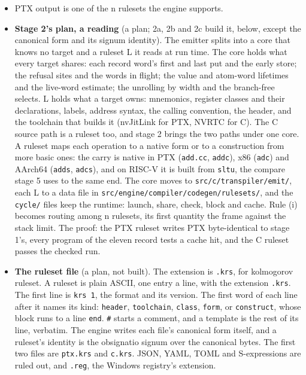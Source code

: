 \begin{enumerate}
\begin{itemize}
\begin{enumerate}
\begin{itemize}
\item PTX output is one of the n rulesets the engine supports.
\item \textbf{Stage 2's plan, a reading} (a plan; 2a, 2b and 2c build it, below, except the canonical form and its signum identity). The emitter splits into a core that knows no target and a ruleset L it reads at run time. The core holds what every target shares: each record word's first and last put and the early store; the refusal sites and the words in flight; the value and atom-word lifetimes and the live-word estimate; the unrolling by width and the branch-free selects. L holds what a target owns: mnemonics, register classes and their declarations, labels, address syntax, the calling convention, the header, and the toolchain that builds it (nvJitLink for PTX, NVRTC for C). The C source path is a ruleset too, and stage 2 brings the two paths under one core. A ruleset maps each operation to a native form or to a construction from more basic ones: the carry is native in PTX (\texttt{add.\allowbreak{}cc}, \texttt{addc}), x86 (\texttt{adc}) and AArch64 (\texttt{adds}, \texttt{adcs}), and on RISC-V it is built from \texttt{sltu}, the compare stage 5 uses to the same end. The core moves to \texttt{src/\allowbreak{}c/\allowbreak{}transpiler/\allowbreak{}emit/\allowbreak{}}, each L to a data file in \texttt{src/\allowbreak{}engine/\allowbreak{}compiler/\allowbreak{}codegen/\allowbreak{}rulesets/\allowbreak{}}, and the \texttt{cycle/\allowbreak{}} files keep the runtime: launch, share, check, block and cache. Rule (i) becomes routing among n rulesets, its first quantity the frame against the stack limit. The proof: the PTX ruleset writes PTX byte-identical to stage 1's, every program of the eleven record tests a cache hit, and the C ruleset passes the checked run.
\item \textbf{The ruleset file} (a plan, not built). The extension is \texttt{.\allowbreak{}krs}, for kolmogorov ruleset. A ruleset is plain ASCII, one entry a line, with the extension \texttt{.\allowbreak{}krs}. The first line is \texttt{krs 1}, the format and its version. The first word of each line after it names its kind: \texttt{header}, \texttt{toolchain}, \texttt{class}, \texttt{form}, or \texttt{construct}, whose block runs to a line \texttt{end}. \texttt{\#} starts a comment, and a template is the rest of its line, verbatim. The engine writes each file's canonical form itself, and a ruleset's identity is the obsignatio signum over the canonical bytes. The first two files are \texttt{ptx.\allowbreak{}krs} and \texttt{c.\allowbreak{}krs}. JSON, YAML, TOML and S-expressions are ruled out, and \texttt{.\allowbreak{}reg}, the Windows registry's extension.

\end{itemize}
\end{enumerate}
\end{itemize}
\end{enumerate}
